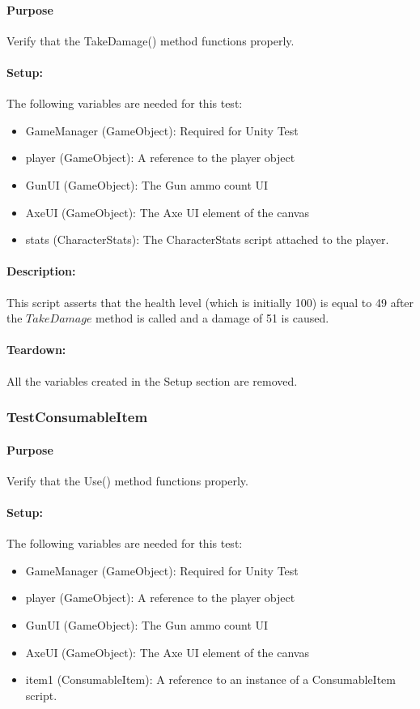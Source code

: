\documentclass[12pt, titlepage]{article}
\begin{document}
\paragraph{Purpose} Verify that the TakeDamage() method functions properly.

\paragraph{Setup: } The following variables are needed for this test:
\begin{itemize}
	\item GameManager (GameObject): Required for Unity Test
	\item  player (GameObject): A reference to the player object
	\item  GunUI (GameObject): The Gun ammo count UI
	\item AxeUI (GameObject): The Axe UI element of the canvas
	\item stats (CharacterStats): The CharacterStats script attached to the player.

\end{itemize}
\paragraph{Description: }
This script asserts that the health level (which is initially 100) is equal to 49 after the $TakeDamage$ method is called and a damage of 51 is caused.
\paragraph{Teardown: } All the variables created in the Setup section are removed.
\subsubsection{Test\textunderscore ConsumableItem}

\paragraph{Purpose} Verify that the Use() method functions properly.

\paragraph{Setup: } The following variables are needed for this test:
\begin{itemize}
	\item GameManager (GameObject): Required for Unity Test
	\item  player (GameObject): A reference to the player object
	\item  GunUI (GameObject): The Gun ammo count UI
	\item AxeUI (GameObject): The Axe UI element of the canvas
	\item item1 (ConsumableItem): A reference to an instance of a ConsumableItem script.
	
\end{itemize}
\end{document}

